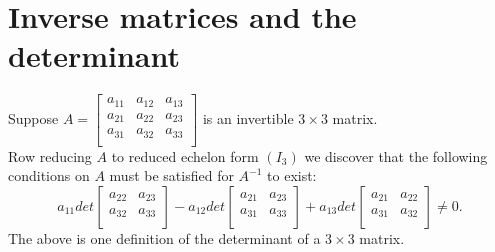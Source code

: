 \documentclass[../main.tex]{subfiles}
\begin{document}
  \section{Inverse matrices and the determinant}
          Suppose $A = \begin{bmatrix}
          a_{11} & a_{12} & a_{13}\\
          a_{21} & a_{22} & a_{23}\\
          a_{31} & a_{32} & a_{33}\\
          \end{bmatrix}$ is an invertible $3 \times  3 $ matrix.\\
          Row reducing $ A$ to reduced echelon form $\left( I_3 \right) $ we discover that the following conditions on $A $ must be satisfied for $A^{-1}$ to exist:
          \[
          a_{11} det \begin{bmatrix}
          a_{22} & a_{23}\\
           a_{32}& a_{33}\\
          \end{bmatrix} - a_{12} det \begin{bmatrix}
          a_{21} & a_{23}\\
          a_{31} & a_{33}\\
          \end{bmatrix} + a_{13} det \begin{bmatrix}
          a_{21} & a_{22}\\
          a_{31} & a_{32}\\
          \end{bmatrix}\neq 0
          .\] 
          The above is one definition of the determinant of a $3 \times  3$ matrix.\\
          
          
  
\end{document}
